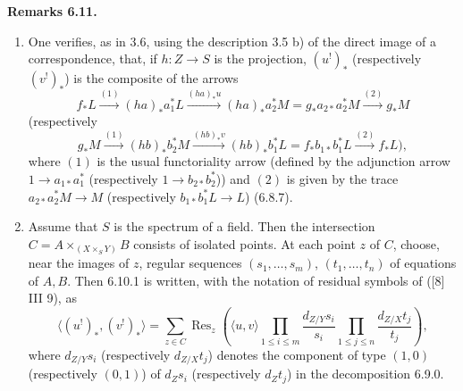 \documentclass[11pt]{article}
\newenvironment{statement}[1]{\par\medskip\noindent\textbf{#1.}\ }{\par\medskip}
\providecommand{\Res}{\operatorname{Res}}
\begin{document}
\begin{statement}{Remarks 6.11}
\begin{enumerate}[label=\alph*)]
\item One verifies, as in 3.6, using the description 3.5 b) of the direct image of a correspondence, that, if $h:Z\to S$ is the projection, $(u^!)_*$ (respectively $(v^!)_*$) is the composite of the arrows
\[
f_*L\xrightarrow{(1)}(ha)_*a_1^*L\xrightarrow{(ha)_*u}(ha)_*a_2^*M=g_*a_{2*}a_2^*M\xrightarrow{(2)}g_*M
\]
(respectively
\[
g_*M\xrightarrow{(1)}(hb)_*b_2^*M\xrightarrow{(hb)_*v}(hb)_*b_1^*L=f_*b_{1*}b_1^*L\xrightarrow{(2)}f_*L),
\]
where $(1)$ is the usual functoriality arrow (defined by the adjunction arrow $1\to a_{1*}a_1^*$ (respectively $1\to b_{2*}b_2^*$)) and $(2)$ is given by the trace $a_{2*}a_2^*M\to M$ (respectively $b_{1*}b_1^*L\to L$) (6.8.7).

\item Assume that $S$ is the spectrum of a field. Then the intersection $C=A\times_{(X\times_SY)}B$ consists of isolated points. At each point $z$ of $C$, choose, near the images of $z$, regular sequences $(s_1,\ldots,s_m)$, $(t_1,\ldots,t_n)$ of equations of $A,B$. Then 6.10.1 is written, with the notation of residual symbols of ([8] III 9), as
\begin{equation}
\tag{6.11.1}
\langle (u^!)_*,(v^!)_*\rangle=
\sum_{z\in C}\Res_z\left(\langle u,v\rangle
\prod_{1\le i\le m}\frac{d_{Z/Y}s_i}{s_i}
\prod_{1\le j\le n}\frac{d_{Z/X}t_j}{t_j}\right),
\end{equation}
where $d_{Z/Y}s_i$ (respectively $d_{Z/X}t_j$) denotes the component of type $(1,0)$ (respectively $(0,1)$) of $d_Zs_i$ (respectively $d_Zt_j$) in the decomposition 6.9.0.
\end{enumerate}
\end{statement}
\end{document}
